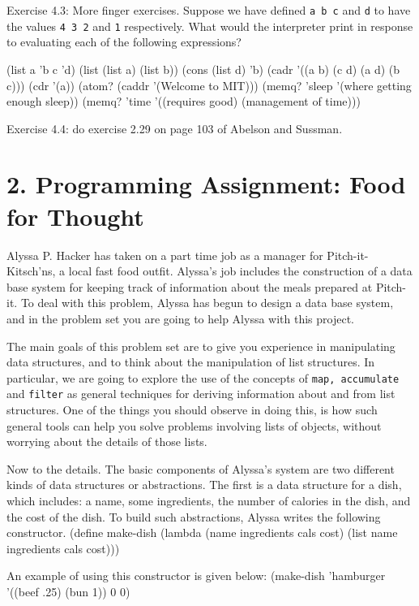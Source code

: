 \bpar Exercise 4.3: More finger exercises.  Suppose we have defined 
{\tt a b c} and {\tt d} to have the values {\tt 4 3 2} and {\tt 1}
respectively.
 What would the interpreter print in response to evaluating each of the
following expressions?

\beginlisp
(list a 'b c 'd)
(list (list a) (list b))
(cons (list d) 'b)
(cadr '((a b) (c d) (a d) (b c)))
(cdr '(a))
(atom? (caddr '(Welcome to MIT)))
(memq? 'sleep '(where getting enough sleep))
(memq? 'time '((requires good) (management of time)))
\endlisp

\bpar Exercise 4.4: do exercise 2.29 on page 103 of Abelson and
Sussman.

\endbullets

\chapter{2. Programming Assignment: Food for Thought}

Alyssa P. Hacker has taken on a part time job as a manager for Pitch-it-Kitsch'ns,
a local fast food outfit.  Alyssa's job includes the construction of a
data base system for keeping track of information about the meals
prepared at Pitch-it.  To deal with this problem, Alyssa has begun to
design a data base system, and in the problem set you are going to help
Alyssa with this project.

The main goals of this problem set are to give you experience in
manipulating data structures, and to think about the manipulation of
list structures.  In particular, we are going to explore the use of
the concepts of {\tt map, accumulate} and {\tt filter} as general
techniques for deriving information about and from list structures.  One
of the things you should observe in doing this, is how such general
tools can help you solve problems involving lists of objects, without
worrying about the details of those lists.

Now to the details.
The basic components of Alyssa's system are two different kinds of data
structures or abstractions.  The first is a data structure for a dish,
which includes:  a name, some ingredients, the
number of calories in the dish, and the cost of the dish.  To build such
abstractions, Alyssa writes the following constructor.
\beginlisp
(define make-dish
  (lambda (name ingredients cals cost)
    (list name ingredients cals cost)))
\endlisp

An example of using this constructor is given below:
\beginlisp
(make-dish 'hamburger '((beef .25) (bun 1)) 0 0)
\endlisp

